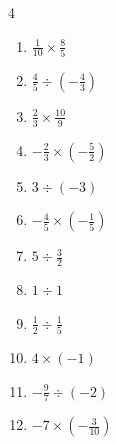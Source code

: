 \begin{multicols}{4}
\begin{enumerate}
  \item $\displaystyle \frac{1}{10}\times{}\frac{8}{5}$


  \item $\displaystyle \frac{4}{5}\div{}\left(-\frac{4}{3}\right)$


  \item $\displaystyle \frac{2}{3}\times{}\frac{10}{9}$


  \item $\displaystyle -\frac{2}{3}\times{}\left(-\frac{5}{2}\right)$


  \item $\displaystyle 3\div{}\left(-3\right)$

        \phantom{$\displaystyle =-1$}

\columnbreak %

  \item $\displaystyle -\frac{4}{5}\times{}\left(-\frac{1}{5}\right)$


  \item $\displaystyle 5\div{}\frac{3}{2}$


  \item $\displaystyle 1\div{}1$

        \phantom{$\displaystyle =1$}

  \item $\displaystyle \frac{1}{2}\div{}\frac{1}{5}$


  \item $\displaystyle 4\times{}\left(-1\right)$

        \phantom{$\displaystyle =-4$}

  \item $\displaystyle -\frac{9}{7}\div{}\left(-2\right)$


  \item $\displaystyle -7\times{}\left(-\frac{3}{10}\right)$


\end{enumerate}
\end{multicols}
